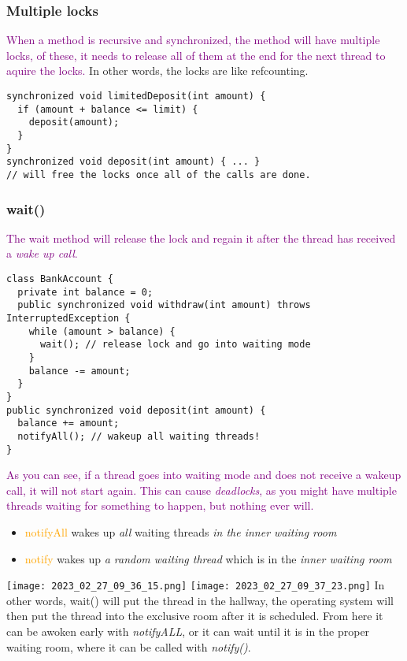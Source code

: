 \documentclass[main.tex,fontsize=8pt,paper=a4,paper=portrait,DIV=calc,]{scrartcl}
\begin{document}
\subsubsection{Multiple locks}
\textcolor{purple}{When a method is recursive and synchronized, the method will have multiple locks, of these, it needs to release all of them at the end for the next thread to aquire the locks.}\newline
In other words, the locks are like refcounting. 
\begin{lstlisting}
synchronized void limitedDeposit(int amount) {
  if (amount + balance <= limit) {
    deposit(amount);
  }
}
synchronized void deposit(int amount) { ... }
// will free the locks once all of the calls are done.
\end{lstlisting}

\subsubsection{wait()}
\textcolor{purple}{The wait method will release the lock and regain it after the thread has received a \emph{wake up call}.}
\begin{lstlisting}
class BankAccount {
  private int balance = 0;
  public synchronized void withdraw(int amount) throws InterruptedException {
    while (amount > balance) {
      wait(); // release lock and go into waiting mode
    }
    balance -= amount;
  }
}
public synchronized void deposit(int amount) {
  balance += amount;
  notifyAll(); // wakeup all waiting threads!
}
\end{lstlisting}
\textcolor{purple}{As you can see, if a thread goes into waiting mode and does not receive a wakeup call, it will not start again.\newline
This can cause \emph{deadlocks}, as you might have multiple threads waiting for something to happen, but nothing ever will.}
\begin{itemize}
  \item \textcolor{orange}{notifyAll} wakes up \emph{all} waiting threads \emph{in the inner waiting room}
  \item \textcolor{orange}{notify} wakes up \emph{a random waiting thread} which is in the \emph{inner waiting room}\newline
\end{itemize} 
\texttt{[image: 2023\_02\_27\_09\_36\_15.png]}
\texttt{[image: 2023\_02\_27\_09\_37\_23.png]}
In other words, wait() will put the thread in the hallway, the operating system will then put the thread into the exclusive room after it is scheduled. From here it can be awoken early with \emph{notifyALL}, or it can wait until it is in the proper waiting room, where it can be called with \emph{notify()}.
\end{document}

